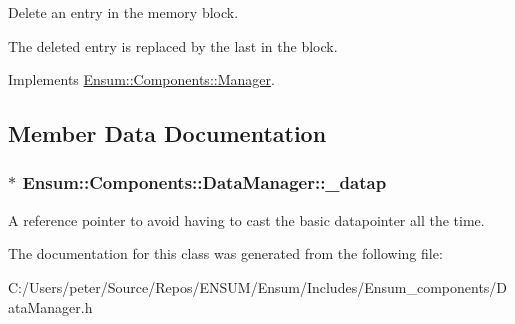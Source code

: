 Delete an entry in the memory block. 

The deleted entry is replaced by the last in the block. 

Implements \hyperlink{class_ensum_1_1_components_1_1_manager_a5ba85395802e942ed8904ca18951e6b0}{Ensum\+::\+Components\+::\+Manager}.



\subsection{Member Data Documentation}
\subsubsection[{\texorpdfstring{\+\_\+datap}{_datap}}]{$\ast$ Ensum\+::\+Components\+::\+Data\+Manager\+::\+\_\+datap\hspace{0.3cm}{\ttfamily [private]}}\hypertarget{class_ensum_1_1_components_1_1_data_manager_a03fb52e21fcfdf08e9dd11a71da74385}{}\label{class_ensum_1_1_components_1_1_data_manager_a03fb52e21fcfdf08e9dd11a71da74385}
A reference pointer to avoid having to cast the basic datapointer all the time. 

The documentation for this class was generated from the following file\+:\begin{DoxyCompactItemize}
\item 
C\+:/\+Users/peter/\+Source/\+Repos/\+E\+N\+S\+U\+M/\+Ensum/\+Includes/\+Ensum\+\_\+components/Data\+Manager.\+h\end{DoxyCompactItemize}
